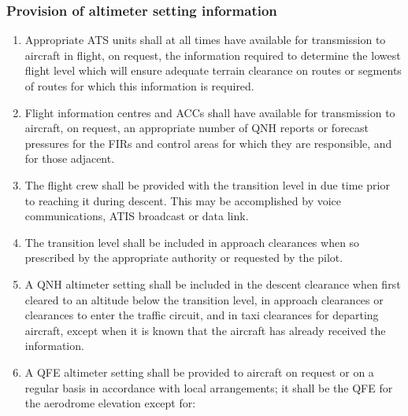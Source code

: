 \documentclass[../vATM.tex]{subfiles}
\begin{document}
    \subsubsection{Provision of altimeter setting information}

    \begin{enumerate}
        \item Appropriate ATS units shall at all times have available for transmission to aircraft in flight, on request, the information required to determine the lowest flight level which will ensure adequate terrain clearance on routes or segments of routes for which this information is required.
        \item Flight information centres and ACCs shall have available for transmission to aircraft, on request, an appropriate number of QNH reports or forecast pressures for the FIRs and control areas for which they are responsible, and for those adjacent.
        \item The flight crew shall be provided with the transition level in due time prior to reaching it during descent. This may be accomplished by voice communications, ATIS broadcast or data link.
        \item The transition level shall be included in approach clearances when so prescribed by the appropriate authority or requested by the pilot.
        \item A QNH altimeter setting shall be included in the descent clearance when first cleared to an altitude below the transition level, in approach clearances or clearances to enter the traffic circuit, and in taxi clearances for departing aircraft, except when it is known that the aircraft has already received the information.
        \item A QFE altimeter setting shall be provided to aircraft on request or on a regular basis in accordance with local arrangements; it shall be the QFE for the aerodrome elevation except for:



\end{enumerate}
\end{document}
